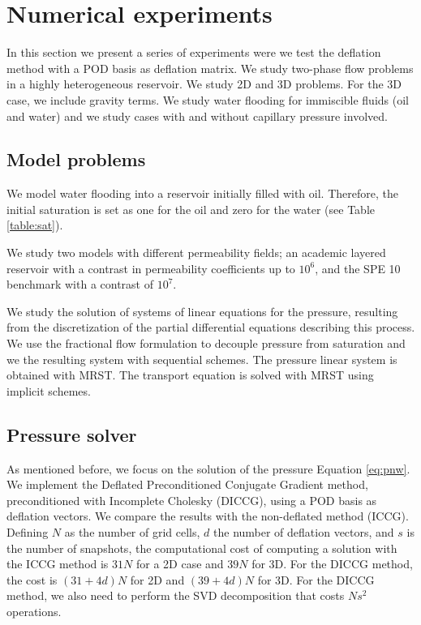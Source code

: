 \documentclass[12pt]{article}
\begin{document}
\newpage
\section{Numerical experiments}\label{numexp}
\hspace{0.5cm} In this section we present a series of experiments were we test the deflation method with a POD basis as deflation 
matrix. We study two-phase flow problems in a highly heterogeneous reservoir. We study 2D and 3D problems. For the 3D case, 
we include gravity terms. We study water flooding for immiscible fluids (oil and water) and we study cases with and without 
capillary pressure involved.   
\subsection*{Model problems}\label{modpro}
\hspace{0.5cm}We model water flooding into a reservoir initially filled with oil. Therefore, the initial saturation is set 
as one for the oil and zero for the water (see Table \ref{table:sat}). \par
We study two models with different permeability fields; an academic layered reservoir with a contrast in permeability 
coefficients up to $10^{6}$, and the SPE 10 benchmark \cite{Christie01} with a contrast of $10^{7}$. \par
We study the solution of systems of linear equations for the pressure, resulting from the discretization of the partial 
differential equations describing this process. We use the fractional flow formulation to decouple pressure from saturation 
and we the resulting system with sequential schemes. The pressure linear system is obtained with MRST. The transport equation 
is solved with MRST using implicit schemes.
\subsection*{Pressure solver}
\hspace{0.5cm}As mentioned before, we focus on the solution of the pressure Equation \eqref{eq:pnw}. We implement the Deflated 
Preconditioned Conjugate Gradient method, preconditioned with Incomplete Cholesky (DICCG), using a POD basis as deflation vectors.
We compare the results with the non-deflated method (ICCG). 
Defining $N$ as the number of grid cells, $d$ the number of deflation vectors, and $s$ is the number of snapshots, the 
computational cost of computing a solution with the ICCG method is $31 N$ for a 2D case and $39N$ for 3D. For the DICCG method, 
the cost is $(31+4d)N$ for 2D and $(39+4d)N$ for 3D. For the DICCG method, we also need to perform the SVD decomposition that 
costs $Ns^2$ operations. \par
\end{document}
